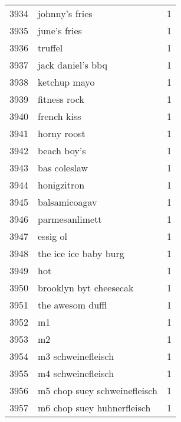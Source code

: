 \begin{tabular}{llr}
3934 &                                     johnny’s fries &      1 \\
3935 &                                       june’s fries &      1 \\
3936 &                                            truffel &      1 \\
3937 &                                  jack daniel’s bbq &      1 \\
3938 &                                       ketchup mayo &      1 \\
3939 &                                       fitness rock &      1 \\
3940 &                                        french kiss &      1 \\
3941 &                                        horny roost &      1 \\
3942 &                                        beach boy’s &      1 \\
3943 &                                       bas coleslaw &      1 \\
3944 &                                        honigzitron &      1 \\
3945 &                                      balsamicoagav &      1 \\
3946 &                                     parmesanlimett &      1 \\
3947 &                                           essig ol &      1 \\
3948 &                              the ice ice baby burg &      1 \\
3949 &                                                hot &      1 \\
3950 &                             brooklyn byt cheesecak &      1 \\
3951 &                                   the awesom duffl &      1 \\
3952 &                                                 m1 &      1 \\
3953 &                                                 m2 &      1 \\
3954 &                                 m3 schweinefleisch &      1 \\
3955 &                                 m4 schweinefleisch &      1 \\
3956 &                       m5 chop suey schweinefleisch &      1 \\
3957 &                         m6 chop suey huhnerfleisch &      1 \\

\end{tabular}
